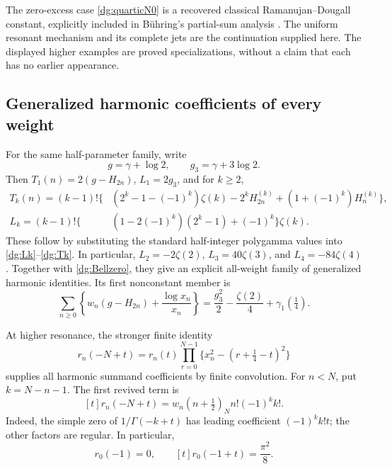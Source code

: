 The zero-excess case \eqref{dg:quarticN0} is a recovered classical
Ramanujan--Dougall constant, explicitly included in B\"uhring's
partial-sum analysis \cite[Section 4, Corollaries 1--2]{buhring}.
The uniform resonant mechanism and its complete jets are the
continuation supplied here. The displayed higher examples are proved
specializations, without a claim that each has no earlier appearance.

\subsection{Generalized harmonic coefficients of every weight}
For the same half-parameter family, write
\[
 g=\gamma+\log2,\qquad g_3=\gamma+3\log2.
\]
Then $T_1(n)=2(g-H_{2n})$, $L_1=2g_3$, and for $k\ge2$,
\begin{align}
 T_k(n)=(k-1)!\big\{&
 (2^k-1-(-1)^k)\zeta(k)-2^kH_{2n}^{(k)}
                  +(1+(-1)^k)H_n^{(k)}\big\},
                    \label{dg:harmonicTk}\\
 L_k=(k-1)!\big\{&(1-2(-1)^k)(2^k-1)+(-1)^k\big\}\zeta(k).
                    \label{dg:harmonicLk}
\end{align}
These follow by substituting the standard half-integer polygamma
values into \eqref{dg:Lk}--\eqref{dg:Tk}. In particular,
$L_2=-2\zeta(2)$, $L_3=40\zeta(3)$, and $L_4=-84\zeta(4)$.
Together with \eqref{dg:Bellzero}, they give an explicit all-weight
family of generalized harmonic identities. Its first nonconstant
member is
\begin{equation}\label{dg:quarticharmonic1}
 \boxed{\sum_{n\ge0}\left\{w_n(g-H_{2n})
                         +\frac{\log x_n}{x_n}\right\}
       =\frac{g_3^2}{2}-\frac{\zeta(2)}4+\gamma_1(\tfrac14).}
\end{equation}

At higher resonance, the stronger finite identity
\begin{equation}\label{dg:quarticshift}
 r_n(-N+t)=r_n(t)\prod_{r=0}^{N-1}
                   \{x_n^2-(r+\tfrac14-t)^2\}
\end{equation}
supplies all harmonic summand coefficients by finite convolution.
For $n<N$, put $k=N-n-1$. The first revived term is
\begin{equation}\label{dg:quarticrevival}
 [t]r_n(-N+t)=w_n(n+\tfrac12)_N n!(-1)^k k!.
\end{equation}
Indeed, the simple zero of $1/\Gamma(-k+t)$ has leading coefficient
$(-1)^kk!t$; the other factors are regular. In particular,
\begin{equation}\label{dg:revivalpi}
 r_0(-1)=0,\qquad [t]r_0(-1+t)=\frac{\pi^2}{8}.
\end{equation}

